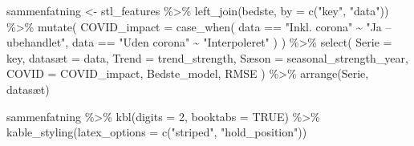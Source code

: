 \documentclass[
  danish,
]{article}
\newenvironment{Shaded}{\begin{snugshade}}{\end{snugshade}}
\newcommand{\AttributeTok}[1]{\textcolor[rgb]{0.40,0.45,0.13}{#1}}
\newcommand{\ConstantTok}[1]{\textcolor[rgb]{0.56,0.35,0.01}{#1}}
\newcommand{\DecValTok}[1]{\textcolor[rgb]{0.68,0.00,0.00}{#1}}
\newcommand{\FunctionTok}[1]{\textcolor[rgb]{0.28,0.35,0.67}{#1}}
\newcommand{\NormalTok}[1]{\textcolor[rgb]{0.00,0.23,0.31}{#1}}
\newcommand{\OtherTok}[1]{\textcolor[rgb]{0.00,0.23,0.31}{#1}}
\newcommand{\SpecialCharTok}[1]{\textcolor[rgb]{0.37,0.37,0.37}{#1}}
\newcommand{\StringTok}[1]{\textcolor[rgb]{0.13,0.47,0.30}{#1}}
\begin{document}
\begin{Shaded}
\begin{Highlighting}[]
\NormalTok{sammenfatning }\OtherTok{\textless{}{-}}\NormalTok{ stl\_features }\SpecialCharTok{\%\textgreater{}\%}
  \FunctionTok{left\_join}\NormalTok{(bedste, }\AttributeTok{by =} \FunctionTok{c}\NormalTok{(}\StringTok{"key"}\NormalTok{, }\StringTok{"data"}\NormalTok{)) }\SpecialCharTok{\%\textgreater{}\%}
  \FunctionTok{mutate}\NormalTok{(}
    \AttributeTok{COVID\_impact =} \FunctionTok{case\_when}\NormalTok{(}
\NormalTok{      data }\SpecialCharTok{==} \StringTok{"Inkl. corona"} \SpecialCharTok{\textasciitilde{}} \StringTok{"Ja – ubehandlet"}\NormalTok{,}
\NormalTok{      data }\SpecialCharTok{==} \StringTok{"Uden corona"}  \SpecialCharTok{\textasciitilde{}} \StringTok{"Interpoleret"}
\NormalTok{    )}
\NormalTok{  ) }\SpecialCharTok{\%\textgreater{}\%}
  \FunctionTok{select}\NormalTok{(}
    \AttributeTok{Serie        =}\NormalTok{ key,}
\NormalTok{    datasæt      }\OtherTok{=}\NormalTok{ data,}
    \AttributeTok{Trend        =}\NormalTok{ trend\_strength,}
\NormalTok{    Sæson        }\OtherTok{=}\NormalTok{ seasonal\_strength\_year,}
    \AttributeTok{COVID        =}\NormalTok{ COVID\_impact,}
\NormalTok{    Bedste\_model,}
\NormalTok{    RMSE}
\NormalTok{  ) }\SpecialCharTok{\%\textgreater{}\%}
  \FunctionTok{arrange}\NormalTok{(Serie, datasæt)}

\NormalTok{sammenfatning }\SpecialCharTok{\%\textgreater{}\%}
  \FunctionTok{kbl}\NormalTok{(}\AttributeTok{digits =} \DecValTok{2}\NormalTok{, }\AttributeTok{booktabs =} \ConstantTok{TRUE}\NormalTok{) }\SpecialCharTok{\%\textgreater{}\%}
  \FunctionTok{kable\_styling}\NormalTok{(}\AttributeTok{latex\_options =} \FunctionTok{c}\NormalTok{(}\StringTok{"striped"}\NormalTok{, }\StringTok{"hold\_position"}\NormalTok{))}
\end{Highlighting}
\end{Shaded}
\end{document}
